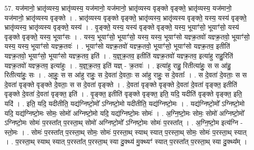 \documentclass[17pt]{extarticle}
\begin{document}
57. यज॑मानो॒ भ्रातृ॑व्यस्य॒ भ्रातृ॑व्यस्य॒ यज॑मानो॒ यज॑मानो॒ भ्रातृ॑व्यस्य वृङ्क्ते वृङ्क्ते॒ भ्रातृ॑व्यस्य॒ यज॑मानो॒ यज॑मानो॒ भ्रातृ॑व्यस्य वृङ्क्ते । . भ्रातृ॑व्यस्य वृङ्क्ते वृङ्क्ते॒ भ्रातृ॑व्यस्य॒ भ्रातृ॑व्यस्य वृङ्क्ते॒ यस्य॒ यस्य॑ वृङ्क्ते॒ भ्रातृ॑व्यस्य॒ भ्रातृ॑व्यस्य वृङ्क्ते॒ यस्य॑ । . वृ॒ङ्क्ते॒ यस्य॒ यस्य॑ वृङ्क्ते वृङ्क्ते॒ यस्य॒ भूयाꣳ॑सो॒ भूयाꣳ॑सो॒ यस्य॑ वृङ्क्ते वृङ्क्ते॒ यस्य॒ भूयाꣳ॑सः । . यस्य॒ भूयाꣳ॑सो॒ भूयाꣳ॑सो॒ यस्य॒ यस्य॒ भूयाꣳ॑सो यज्ञ्क्र॒तवो॑ यज्ञ्क्र॒तवो॒ भूयाꣳ॑सो॒ यस्य॒ यस्य॒ भूयाꣳ॑सो यज्ञ्क्र॒तवः॑ । . भूयाꣳ॑सो यज्ञ्क्र॒तवो॑ यज्ञ्क्र॒तवो॒ भूयाꣳ॑सो॒ भूयाꣳ॑सो यज्ञ्क्र॒तव॒ इतीति॑ यज्ञ्क्र॒तवो॒ भूयाꣳ॑सो॒ भूयाꣳ॑सो यज्ञ्क्र॒तव॒ इति॑ । . य॒ज्ञ्॒क्र॒तव॒ इतीति॑ यज्ञ्क्र॒तवो॑ यज्ञ्क्र॒तव॒ इत्या॑हु राहु॒रिति॑ यज्ञ्क्र॒तवो॑ यज्ञ्क्र॒तव॒ इत्या॑हुः । . य॒ज्ञ्॒क्र॒तव॒ इति॑ यज्ञ् - क्र॒तवः॑ । . इत्या॑हु राहु॒ रितीत्या॑हुः॒ स स आ॑हु॒ रितीत्या॑हुः॒ सः । . आ॒हुः॒ स स आ॑हु राहुः॒ स दे॒वता॑ दे॒वताः॒ स आ॑हु राहुः॒ स दे॒वताः᳚ । . स दे॒वता॑ दे॒वताः॒ स स दे॒वता॑ वृङ्क्ते वृङ्क्ते दे॒वताः॒ स स दे॒वता॑ वृङ्क्ते । . दे॒वता॑ वृङ्क्ते वृङ्क्ते दे॒वता॑ दे॒वता॑ वृङ्क्त॒ इतीति॑ वृङ्क्ते दे॒वता॑ दे॒वता॑ वृङ्क्त॒ इति॑ । . वृ॒ङ्क्त॒ इतीति॑ वृङ्क्ते वृङ्क्त॒ इति॒ यदि॒ यदीति॑ वृङ्क्ते वृङ्क्त॒ इति॒ यदि॑ । . इति॒ यदि॒ यदीतीति॒ यद्य॑ग्निष्टो॒मो᳚ ऽग्निष्टो॒मो यदीतीति॒ यद्य॑ग्निष्टो॒मः । . यद्य॑ग्निष्टो॒मो᳚ ऽग्निष्टो॒मो यदि॒ यद्य॑ग्निष्टो॒मः सोमः॒ सोमो॑ अग्निष्टो॒मो यदि॒ यद्य॑ग्निष्टो॒मः सोमः॑ । . अ॒ग्नि॒ष्टो॒मः सोमः॒ सोमो॑ अग्निष्टो॒मो᳚ ऽग्निष्टो॒मः सोमः॑ प॒रस्ता᳚त् प॒रस्ता॒थ् सोमो॑ अग्निष्टो॒मो᳚ ऽग्निष्टो॒मः सोमः॑ प॒रस्ता᳚त् । . अ॒ग्नि॒ष्टो॒म इत्य॑ग्नि - स्तो॒मः । . सोमः॑ प॒रस्ता᳚त् प॒रस्ता॒थ् सोमः॒ सोमः॑ प॒रस्ता॒थ् स्याथ् स्यात् प॒रस्ता॒थ् सोमः॒ सोमः॑ प॒रस्ता॒थ् स्यात् । . प॒रस्ता॒थ् स्याथ् स्यात् प॒रस्ता᳚त् प॒रस्ता॒थ् स्या दु॒क्थ्य॑ मु॒क्थ्यꣳ॑ स्यात् प॒रस्ता᳚त् प॒रस्ता॒थ् स्या दु॒क्थ्य᳚म् । \newline
\end{document}
